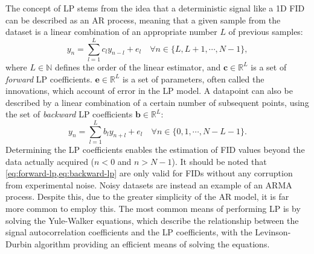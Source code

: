 The concept of \ac{LP} stems from the idea that a deterministic signal like a
\ac{1D} \ac{FID} can be described as an \ac{AR} process, meaning that a given
sample from the dataset is a linear combination of an appropriate number $L$ of
previous samples:
\begin{equation}
    y_n = \sum_{l=1}^{L}
    c_l y_{n-l} + e_l \quad
    \forall n \in \lbrace L, L + 1, \cdots, N - 1 \rbrace,
    \label{eq:forward-lp}
\end{equation}
where $L \in
\mathbb{N}$ defines the order of the linear estimator, and $\symbf{c} \in
\mathbb{R}^{L}$ is a set of \emph{forward} \ac{LP} coefficients. $\symbf{e} \in
\mathbb{R}^L$ is a set of parameters, often called the innovations,
which account of error in the \ac{LP} model. A datapoint can also be described
by a linear combination of a certain number of subsequent points, using the set
of \emph{backward} \ac{LP} coefficients $\symbf{b} \in \mathbb{R}^L$:
\begin{equation}
    y_n = \sum_{l=1}^{L}
    b_l y_{n+l} + e_l \quad
    \forall n \in \lbrace 0, 1, \cdots, N - L - 1 \rbrace.
    \label{eq:backward-lp}
\end{equation}
Determining
the \ac{LP} coefficients enables the estimation of \ac{FID} values beyond the
data actually acquired ($n < 0$ and $n > N - 1$). It should be noted that
\cref{eq:forward-lp,eq:backward-lp} are only valid for
\acp{FID} without any corruption from experimental noise. Noisy datasets are
instead an example of an \ac{ARMA} process. Despite this, due to the greater
simplicity of the \ac{AR} model, it is far more common to employ this. The most
common means of performing \ac{LP} is by solving the Yule-Walker
equations\cite{Yule1927,Walker1931},
which describe the relationship between the signal autocorrelation coefficients
and the \ac{LP} coefficients\cite[Section 3.3]{Koehl1999}, with the
Levinson-Durbin algorithm providing an efficient means of solving the
equations\cite{Levinson1946,Durbin1960}.

